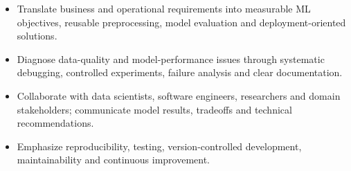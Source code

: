 \documentclass[9pt,letterpaper]{extarticle}
\begin{document}
\begin{itemize}
\item Translate business and operational requirements into measurable ML objectives, reusable preprocessing, model evaluation and deployment-oriented solutions.
\item Diagnose data-quality and model-performance issues through systematic debugging, controlled experiments, failure analysis and clear documentation.
\item Collaborate with data scientists, software engineers, researchers and domain stakeholders; communicate model results, tradeoffs and technical recommendations.
\item Emphasize reproducibility, testing, version-controlled development, maintainability and continuous improvement.
\end{itemize}
\end{document}

